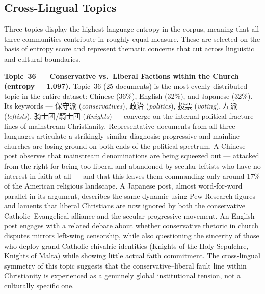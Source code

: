 \documentclass[../CLthesis.tex]{subfiles}
\begin{document}
\subsection{Cross-Lingual Topics}

Three topics display the highest language entropy in the corpus, meaning that all three communities contribute in roughly equal measure. These are selected on the basis of entropy score and represent thematic concerns that cut across linguistic and cultural boundaries.

\textbf{Topic~36 --- Conservative vs.\ Liberal Factions within the Church (entropy = 1.097).}
Topic~36 (25 documents) is the most evenly distributed topic in the entire dataset: Chinese (36\%), English (32\%), and Japanese (32\%). Its keywords --- 保守派 (\textit{conservatives}), 政治 (\textit{politics}), 投票 (\textit{voting}), 左派 (\textit{leftists}), 骑士团/騎士団 (\textit{Knights}) --- converge on the internal political fracture lines of mainstream Christianity. Representative documents from all three languages articulate a strikingly similar diagnosis: progressive and mainline churches are losing ground on both ends of the political spectrum. A Chinese post observes that mainstream denominations are being squeezed out --- attacked from the right for being too liberal and abandoned by secular leftists who have no interest in faith at all --- and that this leaves them commanding only around 17\% of the American religious landscape. A Japanese post, almost word-for-word parallel in its argument, describes the same dynamic using Pew Research figures and laments that liberal Christians are now ignored by both the conservative Catholic--Evangelical alliance and the secular progressive movement. An English post engages with a related debate about whether conservative rhetoric in church disputes mirrors left-wing censorship, while also questioning the sincerity of those who deploy grand Catholic chivalric identities (Knights of the Holy Sepulchre, Knights of Malta) while showing little actual faith commitment. The cross-lingual symmetry of this topic suggests that the conservative--liberal fault line within Christianity is experienced as a genuinely global institutional tension, not a culturally specific one.
\end{document}
